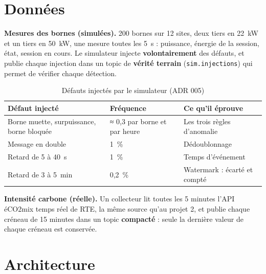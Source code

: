 \documentclass[11pt, a4paper, oneside, headings=normal, numbers=noenddot, DIV=12]{scrartcl}
\begin{document}
\section{Données}

\textbf{Mesures des bornes (simulées).} 200 bornes sur 12 sites, deux tiers en 22~kW et un tiers en 50~kW, une mesure toutes les 5~s :
puissance, énergie de la session, état, session en cours. Le simulateur injecte \textbf{volontairement} des défauts, et publie chaque injection
dans un topic de \textbf{vérité terrain} (\texttt{sim.injections}) qui permet de vérifier chaque détection.

\begin{table}[H]
\centering\small
\begin{tabularx}{\linewidth}{@{}L{4.4cm} L{3.2cm} Y@{}}
\toprule
\textbf{Défaut injecté} & \textbf{Fréquence} & \textbf{Ce qu'il éprouve} \\
\midrule
Borne muette, surpuissance, borne bloquée & ≈ 0,3 par borne et par heure & Les trois règles d'anomalie \\
Message en double & 1~\% & Dédoublonnage \\
Retard de 5 à 40~s & 1~\% & Temps d'événement \\
Retard de 3 à 5~min & 0,2~\% & Watermark : écarté et compté \\
\bottomrule
\end{tabularx}
\caption{Défauts injectés par le simulateur (ADR 005)}
\end{table}

\textbf{Intensité carbone (réelle).} Un collecteur lit toutes les 5 minutes l'API éCO2mix temps réel de RTE, la même source qu'au projet 2,
et publie chaque créneau de 15 minutes dans un topic \textbf{compacté} : seule la dernière valeur de chaque créneau est conservée.

\section{Architecture}
\end{document}

